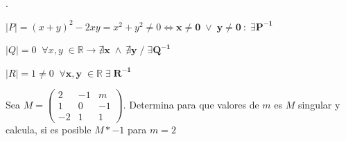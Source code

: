 \begin{proofw}\renewcommand{\qedsymbol}{$\diamond$}.

$|P|=(x+y)^2-2xy=x^2+y^2 \neq 0 \Leftrightarrow  \boldsymbol{ x\neq 0 \; \vee \; y\neq 0\: : \; \exists P^{-1}}$

$|Q|=0\; \; \forall x,y \; \in \mathbb R \to \boldsymbol{ \nexists x \; \wedge \: \nexists y \; / \; \exists Q^{-1}}$

$|R|= 1\neq 0 \; \; \boldsymbol{ \forall x,y \; \in \mathbb R \; \exists \; R^{-1}}$	
\end{proofw}


\begin{ejre}
	Sea $M=\left( \begin{matrix} 2&-1&m\\1&0&-1\\-2&1&1  \end{matrix} \right)$. Determina para que valores de $m$ es $M$ singular y calcula, si es posible $M*{-1}$ para $m=2$
\end{ejre}

